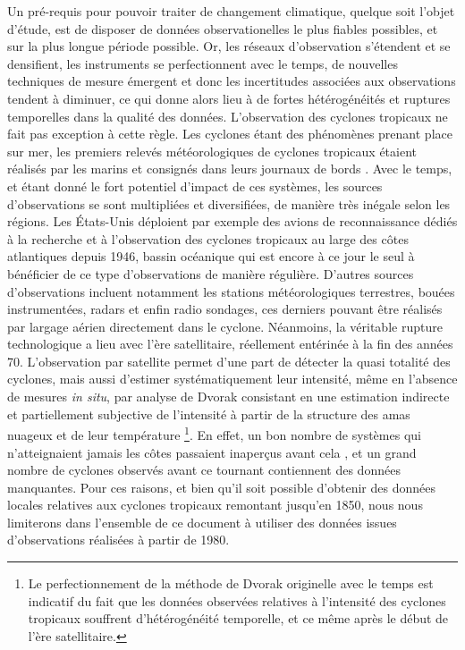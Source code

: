 \documentclass[../main.tex]{subfiles}
\begin{document}
Un pré-requis pour pouvoir traiter de changement climatique, quelque soit l'objet d'étude, est de disposer de données observationelles le plus fiables
possibles, et sur la plus longue période possible. Or, les réseaux d'observation s'étendent et se densifient, les instruments se perfectionnent avec le temps,
de nouvelles techniques de mesure émergent et donc les incertitudes associées aux observations tendent à diminuer, ce qui donne alors lieu à de fortes
hétérogénéités et ruptures temporelles dans la qualité des données. L'observation des cyclones tropicaux ne fait pas exception à cette règle. Les cyclones étant
des phénomènes prenant place sur mer, les premiers relevés météorologiques de cyclones tropicaux étaient réalisés par les marins et consignés dans leurs
journaux de bords \parencite{knapp_international_2010}. Avec le temps, et étant donné le fort potentiel d'impact de ces systèmes, les sources d'observations se
sont multipliées et diversifiées, de manière très inégale selon les régions. Les États-Unis déploient par exemple des avions de reconnaissance dédiés à la
recherche et à l'observation des cyclones tropicaux au large des côtes atlantiques depuis \num{1946}, bassin océanique qui est encore à ce jour le seul à
bénéficier de ce type d'observations de manière régulière. D'autres sources d'observations incluent notamment les stations météorologiques terrestres, bouées
instrumentées, radars et enfin radio sondages, ces derniers pouvant être réalisés par largage aérien directement dans le cyclone. Néanmoins, la véritable
rupture technologique a lieu avec l'ère satellitaire, réellement entérinée à la fin des années 70. L'observation par satellite permet d'une part de détecter la
quasi totalité des cyclones, mais aussi d'estimer systématiquement leur intensité, même en l'absence de mesures \textit{in situ}, par analyse de Dvorak
consistant en une estimation indirecte et partiellement subjective de l'intensité à partir de la structure des amas nuageux et de leur température
\parencite{dvorak_tropical_1975,velden_development_1998,olander_development_2002,olander_advanced_2007,olander_advanced_2019}\footnote{Le perfectionnement de la
méthode de Dvorak originelle avec le temps est indicatif du fait que les données observées relatives à l'intensité des cyclones tropicaux souffrent
d'hétérogénéité temporelle, et ce même après le début de l'ère satellitaire.}. En effet, un bon nombre de systèmes qui n'atteignaient jamais les côtes passaient
inaperçus avant cela \parencite{landsea_atlantic_2004}, et un grand nombre de cyclones observés avant ce tournant contiennent des données manquantes. Pour ces
raisons, et bien qu'il soit possible d'obtenir des données locales relatives aux cyclones tropicaux remontant jusqu'en \num{1850}, nous nous limiterons dans
l'ensemble de ce document à utiliser des données issues d'observations réalisées à partir de \num{1980}.
\end{document}
